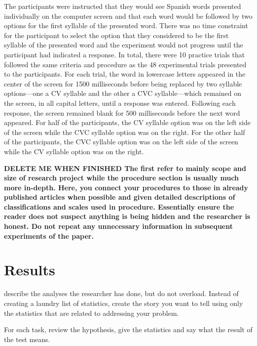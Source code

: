 The participants were instructed that they would see Spanish words presented individually on the computer screen and that each word would be followed by two options for the first syllable of the presented word. There was no time constraint for the participant to select the option that they considered to be the first syllable of the presented word and the experiment would not progress until the participant had indicated a response. In total, there were 10 practice trials that followed the same criteria and procedure as the 48 experimental trials presented to the participants. For each trial, the word in lowercase letters appeared in the center of the screen for 1500 milliseconds before being replaced by two syllable options---one a CV syllable and the other a CVC syllable---which remained on the screen, in all capital letters, until a response was entered. Following each response, the screen remained blank for 500 milliseconds before the next word appeared. For half of the participants, the CV syllable option was on the left side of the screen while the CVC syllable option was on the right. For the other half of the participants, the CVC syllable option was on the left side of the screen while the CV syllable option was on the right.

\textbf{DELETE ME WHEN FINISHED
The first refer to mainly scope and size of research project while the procedure section is usually much more in-depth. Here, you connect your procedures to those in already published articles when possible and given detailed descriptions of classifications and scales used in procedure. Essentially ensure the reader does not suspect anything is being hidden and the researcher is honest. Do not repeat any unnecessary information in subsequent experiments of the paper.}



\section{Results}

describe the analyses the researcher has done, but do not overload. Instead of creating a laundry list of statistics, create the story you want to tell using only the statistics that are related to addressing your problem. 

For each task, review the hypothesis, give the statistics and say what the result of the test means. 

